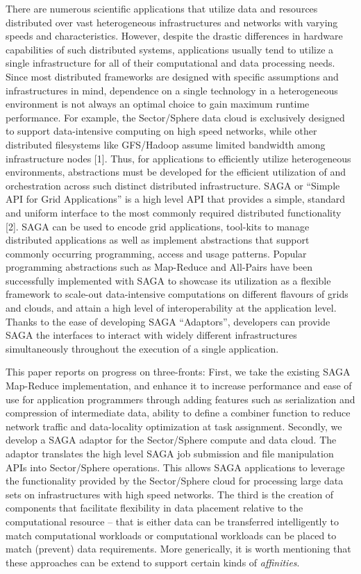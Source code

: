 \documentclass[a4paper,11pt]{article}
\begin{document}
There are numerous scientific applications that utilize data and resources distributed over vast heterogeneous infrastructures and networks with varying speeds and characteristics. However, despite the drastic differences in hardware capabilities of such distributed systems, applications usually tend to utilize a single infrastructure for all of their computational and data processing needs. Since most distributed frameworks are designed with specific assumptions and infrastructures in mind, dependence on a single technology in a heterogeneous environment is not always an optimal choice to gain maximum runtime performance. For example, the Sector/Sphere data cloud is exclusively designed to support data-intensive computing on high speed networks, while other distributed filesystems like GFS/Hadoop assume limited bandwidth among infrastructure nodes [1]. Thus, for applications to efficiently utilize heterogeneous environments, abstractions must be developed for the efficient utilization of and orchestration across such distinct distributed infrastructure.  SAGA or “Simple API for Grid Applications” is a high level API that provides a simple, standard and uniform interface to the most commonly required distributed functionality [2]. SAGA can be used to encode grid applications, tool-kits to manage distributed applications as well as implement abstractions that support commonly occurring programming, access and usage patterns. Popular programming abstractions such as Map-Reduce and All-Pairs have been successfully implemented with SAGA to showcase its utilization as a flexible framework to scale-out data-intensive computations on different flavours of grids and clouds, and attain a high level of interoperability at the application level. Thanks to the ease of developing SAGA “Adaptors”, developers can provide SAGA the interfaces to interact with widely different infrastructures simultaneously throughout the execution of a single application.

This paper reports on progress on three-fronts: First, we take the existing SAGA Map-Reduce implementation, and enhance it to increase performance and ease of use for application programmers through adding features such as serialization and compression of intermediate data, ability to define a combiner function to reduce network traffic and data-locality optimization at task assignment.  Secondly, we develop a SAGA adaptor for the Sector/Sphere compute and data cloud. The adaptor translates the high level SAGA job submission and file manipulation APIs into Sector/Sphere operations. This allows SAGA applications to leverage the functionality provided by the Sector/Sphere cloud for processing large data sets on infrastructures with high speed networks.  The third is the creation of components that facilitate flexibility in data placement relative to the computational resource -- that is either data can be transferred intelligently to match computational workloads or computational workloads can be placed to match (prevent) data requirements. More generically, it is worth mentioning that these approaches can be extend to support certain kinds of {\it affinities}.
\end{document}
